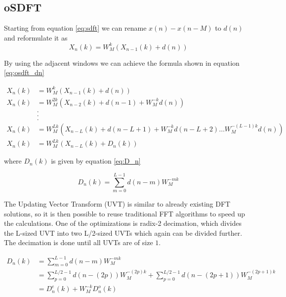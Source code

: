 \documentclass[../main.tex]{subfiles}
\begin{document}
\subsection{oSDFT}
\label{sub:osdft}

Starting from equation \eqref{eq:sdft} we can rename $x(n) - x(n-M)$ to $d(n)$ and reformulate it as
\begin{equation}
    X_n(k) = W_M^{k} (X_{n-1}(k) + d(n))
\end{equation}

By using the adjacent windows we can achieve the formula shown in equation \eqref{eq:osdft_dn}

\begin{align}
    X_n(k) &= W_M^{k} (X_{n-1}(k) + d(n)) \nonumber\\
    X_n(k) &= W_M^{2k} (X_{n-2}(k) + d(n-1) + W_M^{-k}d(n)) \nonumber\\
           &. \nonumber\\
           &. \nonumber\\
           &. \nonumber\\
    X_n(k) &= W_M^{Lk} (X_{n-L}(k) + d(n-L+1) + W_M^{-k}d(n-L+2) \ldots W_M^{-(L-1)k}d(n)) \nonumber\\
    X_n(k) &= W_M^{Lk} (X_{n-L}(k) + D_n(k)) \label{eq:osdft_dn}
\end{align}


where $D_n(k)$ is given by equation \eqref{eq:D_n}

\begin{equation}
    \label{eq:D_n}
    D_n(k) = \sum_{m=0}^{L-1}d(n-m)W_M^{-mk}
\end{equation}

The Updating Vector Transform (UVT) is similar to already existing DFT solutions, so it is then possible to reuse traditional FFT algorithms to speed up the calculations.
One of the optimizations is radix-2 decimation, which divides the L-sized UVT into two L/2-sized UVTs which again can be divided further. The decimation is done until all UVTs are of size $1$.

\begin{align}
    D_n(k) &=  \sum_{m=0}^{L-1} d(n-m) W_{M}^{-mk} \nonumber\\
           &=  \sum_{p=0}^{L/2-1} d(n-(2p)) W_{M}^{-(2p)k} + \sum_{p=0}^{L/2-1} d(n-(2p+1)) W_{M}^{-(2p+1)k} \nonumber\\
           &= D_n^e(k) + W_{M}^{-k} D_n^o(k)
\end{align}
\end{document}
